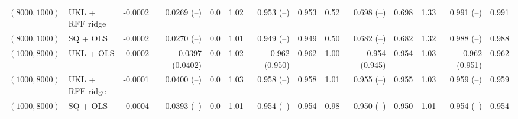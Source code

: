 \begin{tabular}{llrrrrrrrrrrrr}
$(8000,1000)$ & UKL + RFF ridge & -0.0002 & 0.0269 (--) & 0.0 & 1.02 & 0.953 (--) & 0.953 & 0.52 & 0.698 (--) & 0.698 & 1.33 & 0.991 (--) & 0.991 \\
$(8000,1000)$ & SQ + OLS & -0.0002 & 0.0270 (--) & 0.0 & 1.01 & 0.949 (--) & 0.949 & 0.50 & 0.682 (--) & 0.682 & 1.32 & 0.988 (--) & 0.988 \\
$(1000,8000)$ & UKL + OLS & 0.0002 & 0.0397 (0.0402) & 0.0 & 1.02 & 0.962 (0.950) & 0.962 & 1.00 & 0.954 (0.945) & 0.954 & 1.03 & 0.962 (0.951) & 0.962 \\
$(1000,8000)$ & UKL + RFF ridge & -0.0001 & 0.0400 (--) & 0.0 & 1.03 & 0.958 (--) & 0.958 & 1.01 & 0.955 (--) & 0.955 & 1.03 & 0.959 (--) & 0.959 \\
$(1000,8000)$ & SQ + OLS & 0.0004 & 0.0393 (--) & 0.0 & 1.01 & 0.954 (--) & 0.954 & 0.98 & 0.950 (--) & 0.950 & 1.01 & 0.954 (--) & 0.954 \\
\hline
\end{tabular}
